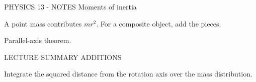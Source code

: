 PHYSICS 13 - NOTES
Moments of inertia

A point mass contributes \(mr^2\). For a composite object, add the pieces.

Parallel-axis theorem.

LECTURE SUMMARY ADDITIONS

Integrate the squared distance from the rotation axis over the mass distribution.
